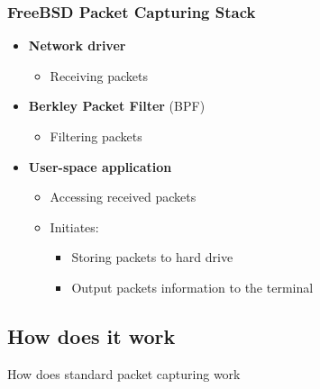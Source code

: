 \begin{frame}
\frametitle{FreeBSD Packet Capturing Stack}
\begin{itemize}
	\item \textbf{Network driver}
		\begin{itemize}
			\item Receiving packets\newline
		\end{itemize}
	\item \textbf{Berkley Packet Filter} (BPF)
		\begin{itemize}
			\item Filtering packets\newline
		\end{itemize}
	\item \textbf{User-space application}
		\begin{itemize}
			\item Accessing received packets
			\item Initiates:
				\begin{itemize}
					\item Storing packets to hard drive
					\item Output packets information to the terminal
				\end{itemize}
		\end{itemize}
\end{itemize}
\end{frame}

\subsection*{How does it work}
\begin{frame}
	\begin{center}
	\huge{How does standard packet capturing work}
	\end{center}
\end{frame}


